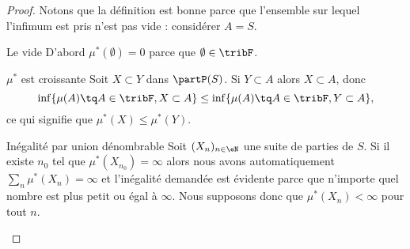\begin{proof}
	Notons que la définition est bonne parce que l'ensemble sur lequel l'infimum est pris n'est pas vide : considérer \( A=S\).
	\begin{subproof}
		\item[Le vide]
		D'abord \( \mu^*(\emptyset)=0\) parce que \( \emptyset\in\tribF\).
		\item[\( \mu^*\) est croissante]
		Soit \( X\subset Y\) dans \( \partP(S)\). Si \( Y\subset A\) alors \( X\subset A\), donc
		\begin{equation}
			\inf \{ \mu(A)\tq A\in\tribF,X\subset A \}\leq \inf \{ \mu(A)\tq A\in\tribF,Y\subset A \},
		\end{equation}
		ce qui signifie que \( \mu^*(X)\leq \mu^*(Y)\).
		\item[Inégalité par union dénombrable]
		Soit \( (X_n)_{n\in \eN}\) une suite de parties de \( S\). Si il existe \( n_0\) tel que \( \mu^*(X_{n_0})=\infty\) alors nous avons automatiquement \( \sum_n\mu^*(X_n)=\infty\) et l'inégalité demandée est évidente parce que n'importe quel nombre est plus petit ou égal à \( \infty\). Nous supposons donc que \( \mu^*(X_n)<\infty\) pour tout \( n\).


\end{subproof}
\end{proof}
